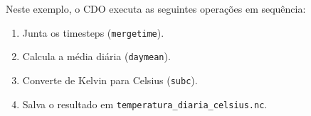 \documentclass[12pt, a4paper]{article}
\begin{document}
Neste exemplo, o CDO executa as seguintes operações em sequência:

\begin{enumerate}
    \item Junta os timesteps (\texttt{mergetime}).
    \item Calcula a média diária (\texttt{daymean}).
    \item Converte de Kelvin para Celsius (\texttt{subc}).
    \item Salva o resultado em \texttt{temperatura\_diaria\_celsius.nc}.
\end{enumerate}
\end{document}
